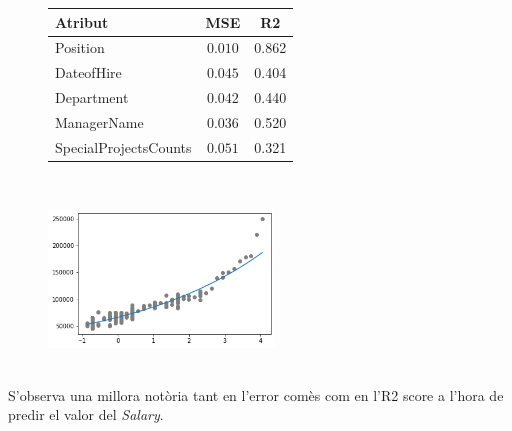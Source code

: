 \documentclass[a4paper, 11pt]{article}
\begin{document}
\begin{figure}[h] %
\begin{minipage}{8cm} %
\begin{center}
    \begin{tabular}{l||c|c}
        \textbf{Atribut} & MSE & R2 \\ \hline \hline
        Position & $0.010$ & 0.862 \\\hline
        DateofHire & $0.045$ & 0.404 \\\hline
        Department & $0.042$ & 0.440 \\\hline
        ManagerName & $0.036$ & 0.520 \\\hline
        SpecialProjectsCounts & $0.051$ & 0.321 \\
    \end{tabular}\\
    \label{tab:afins}
\end{center}
\end{minipage} %
\hspace{2em}
\begin{minipage}{6.3cm} %
\begin{center}
   \begin{center}
    \includegraphics[width=6cm]{Regressor lineal logaritmo/logaritmica_position.png}
    \label{regresor_lineal_simple}
    \end{center}
\end{center}
\end{minipage} %
\end{figure} %
\\
S'observa una millora notòria  tant en l'error comès  com en l'R2 score a l'hora de predir el valor del \textit{Salary}.\\
\end{document}
